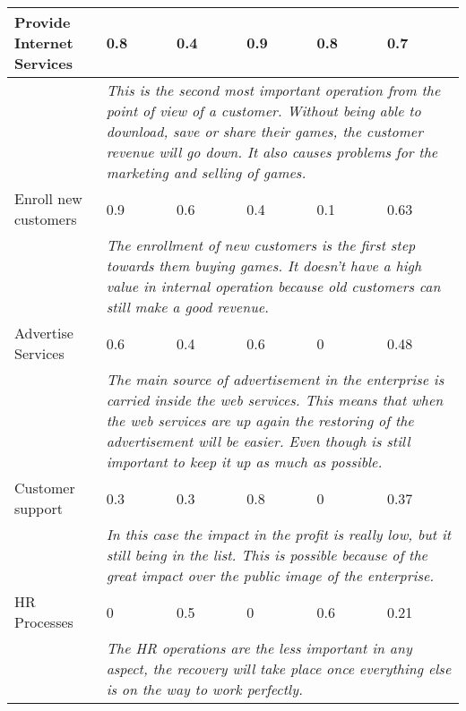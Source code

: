 \begin{longtable}{| p{2.7cm} | p{1.8cm} | p{1.8cm} | p{1.8cm} | p{1.8cm} | p{.8cm} |}
		Provide Internet Services & 0.8 & 0.4 & 0.9 & 0.8 & 0.7\\\hline
		& \multicolumn{5}{|p{9cm}|}{\textit{This is the second most important operation from the point of view of a customer. Without being able to download, save or share their games, the customer revenue will go down. It also causes problems for the marketing and selling of games.}}\\\hline
		Enroll new customers & 0.9 & 0.6 & 0.4 & 0.1 & 0.63\\\hline
		& \multicolumn{5}{|p{9cm}|}{\textit{The enrollment of new customers is the first step towards them buying games. It doesn't have a high value in internal operation because old customers can still make a good revenue.}}\\\hline
		Advertise Services & 0.6 & 0.4 & 0.6 & 0 & 0.48\\\hline
		& \multicolumn{5}{|p{9cm}|}{\textit{The main source of advertisement in the enterprise is carried inside the web services. This means that when the web services are up again the restoring of the advertisement will be easier. Even though is still important to keep it up as much as possible.}}\\\hline
		Customer support & 0.3 & 0.3 & 0.8 & 0 & 0.37\\\hline
		& \multicolumn{5}{|p{9cm}|}{\textit{In this case the impact in the profit is really low, but it still being in the list. This is possible because of the great impact over the public image of the enterprise.}}\\\hline
		HR Processes & 0 & 0.5 & 0 & 0.6 & 0.21\\\hline
		& \multicolumn{5}{|p{9cm}|}{\textit{The HR operations are the less important in any aspect, the recovery will take place once everything else is on the way to work perfectly.}}\\\hline
\end{longtable}